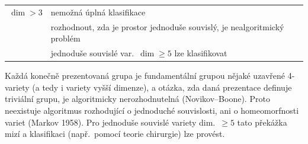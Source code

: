 \begin{tabular}{@{}l@{\quad}p{}}
$\dim > 3$ & nemožná úplná klasifikace \\
 & rozhodnout, zda je prostor jednoduše souvislý, je nealgoritmický problém \\
 & jednoduše souvislé var.\ $\dim\geq 5$ lze klasifikovat
\end{tabular}

\begin{vysvetleni}
Každá konečně prezentovaná grupa je fundamentální grupou nějaké uzavřené 4-variety (a tedy i variety vyšší dimenze), a otázka, zda daná prezentace definuje triviální grupu, je algoritmicky nerozhodnutelná (Novikov--Boone). Proto neexistuje algoritmus rozhodující o jednoduché souvislosti, ani o homeomorfnosti variet (Markov 1958). Pro jednoduše souvislé variety dim.\ $\geq5$ tato překážka mizí a klasifikaci (např.\ pomocí teorie chirurgie) lze provést.
\end{vysvetleni}
